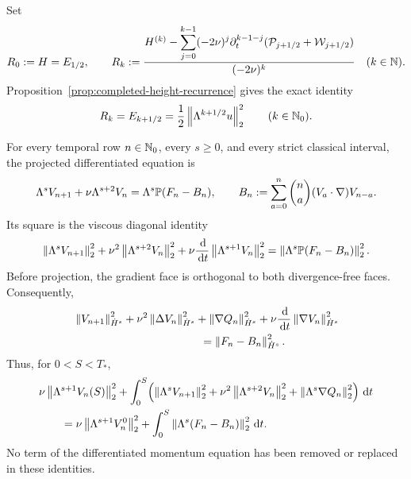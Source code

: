 \begin{definition}
\label{def:completed-critical-height-coordinates}
Set
\begin{equation}
 R_0:=H=E_{1/2},
 \qquad
 R_k
 :=\frac{H^{(k)}-
   \displaystyle\sum_{j=0}^{k-1}(-2\nu)^j
   \partial_t^{k-1-j}(\mathcal P_{j+1/2}+\mathcal W_{j+1/2})}
 {(-2\nu)^k}
 \quad(k\in\mathbb N).
 \label{eq:completed-critical-coordinate}
\end{equation}
Proposition~\ref{prop:completed-height-recurrence} gives the exact identity
\begin{equation}
 R_k=E_{k+1/2}
 =\frac12\left\lVert \Lambda^{k+1/2}u\right\rVert_2^2
 \qquad(k\in\mathbb N_0).
 \label{eq:completed-critical-coordinate-identity}
\end{equation}
\par
\end{definition}

\begin{proposition}
\label{prop:complete-forced-rectangle-cell}
For every temporal row \(n\in\mathbb N_0\), every \(s\ge0\), and every strict
classical interval, the projected differentiated equation is
\begin{equation}
 \Lambda^sV_{n+1}+\nu\Lambda^{s+2}V_n
 =\Lambda^s\mathbb P(F_n-B_n),
 \qquad
 B_n:=\sum_{a=0}^n\binom na(V_a\cdot\nabla)V_{n-a}.
 \label{eq:complete-forced-rectangle-cell}
\end{equation}
Its square is the viscous diagonal identity
\begin{equation}
 \left\lVert \Lambda^sV_{n+1}\right\rVert_2^2
 +\nu^2\left\lVert \Lambda^{s+2}V_n\right\rVert_2^2
 +\nu\frac{\,\mathrm d}{\,\mathrm d t}\left\lVert \Lambda^{s+1}V_n\right\rVert_2^2
 =\left\lVert \Lambda^s\mathbb P(F_n-B_n)\right\rVert_2^2.
 \label{eq:complete-forced-rectangle-square}
\end{equation}
Before projection, the gradient face is orthogonal to both divergence-free
faces.  Consequently,
\begin{align}
 &\norm{V_{n+1}}_{\dot H^s}^2
 +\nu^2\norm{\Delta V_n}_{\dot H^s}^2
 +\norm{\nabla Q_n}_{\dot H^s}^2
 +\nu\frac{\dd}{\dd t}\norm{\nabla V_n}_{\dot H^s}^2
 \notag\\
 &\hspace{4cm}=\norm{F_n-B_n}_{\dot H^s}^2.
 \label{eq:complete-forced-pressure-square}
\end{align}
Thus, for \(0<S<T_*\),
\begin{align}
 &\nu\left\lVert \Lambda^{s+1}V_n(S)\right\rVert_2^2
 +\int_0^S\!\left(
   \left\lVert \Lambda^sV_{n+1}\right\rVert_2^2
   +\nu^2\left\lVert \Lambda^{s+2}V_n\right\rVert_2^2
   +\left\lVert \Lambda^s\nabla Q_n\right\rVert_2^2\right)\,\mathrm d t
 \notag\\
 &\qquad=
 \nu\left\lVert \Lambda^{s+1}V_n^0\right\rVert_2^2
 +\int_0^S\left\lVert \Lambda^s(F_n-B_n)\right\rVert_2^2\,\mathrm d t.
 \label{eq:complete-forced-rectangle-integrated}
\end{align}
No term of the differentiated momentum equation has been removed or replaced
in these identities.
\end{proposition}

